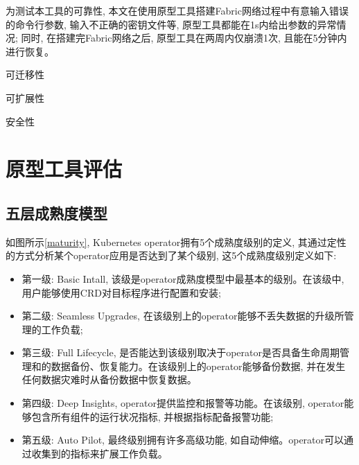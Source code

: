 为测试本工具的可靠性, 本文在使用原型工具搭建Fabric网络过程中有意输入错误的命令行参数, 输入不正确的密钥文件等, 原型工具都能在1s内给出参数的异常情况; 同时, 在搭建完Fabric网络之后, 原型工具在两周内仅崩溃1次, 且能在5分钟内进行恢复。

可迁移性

可扩展性

安全性



\section{原型工具评估}

\subsection{五层成熟度模型}

如图所示\ref{maturity}, Kubernetes operator拥有5个成熟度级别的定义\cite{duan2021case}, 其通过定性的方式分析某个operator应用是否达到了某个级别, 这5个成熟度级别定义如下:

\begin{itemize}[itemindent=2em]
    \item 第一级: Basic Intall, 该级是operator成熟度模型中最基本的级别。在该级中, 用户能够使用CRD对目标程序进行配置和安装;

    \item 第二级: Seamless Upgrades, 在该级别上的operator能够不丢失数据的升级所管理的工作负载;

    \item 第三级: Full Lifecycle, 是否能达到该级别取决于operator是否具备生命周期管理和的数据备份、恢复能力。在该级别上的operator能够备份数据, 并在发生任何数据灾难时从备份数据中恢复数据。

    \item 第四级: Deep Insights, operator提供监控和报警等功能。在该级别, operator能够包含所有组件的运行状况指标, 并根据指标配备报警功能;

    \item 第五级: Auto Pilot, 最终级别拥有许多高级功能, 如自动伸缩。operator可以通过收集到的指标来扩展工作负载。

\end{itemize}

